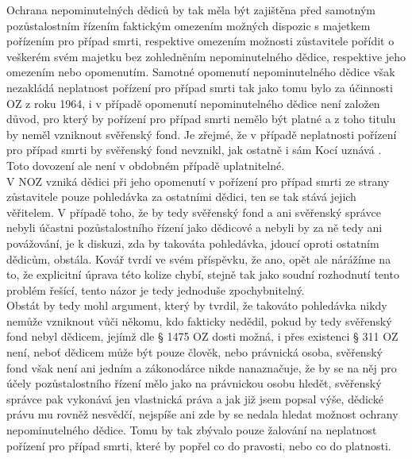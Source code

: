 \documentclass{article}
\begin{document}
 Ochrana nepominutelných dědiců by tak měla být zajištěna před samotným pozůstalostním řízením faktickým omezením možných dispozic s majetkem pořízením pro případ smrti, respektive omezením možnosti zůstavitele pořídit o veškerém svém majetku bez zohledněním nepominutelného dědice, respektive jeho omezením nebo opomenutím. Samotné opomenutí nepominutelného dědice však nezakládá neplatnost pořízení pro případ smrti tak jako tomu bylo za účinnosti OZ z roku 1964, i v případě opomenutí nepominutelného dědice není založen důvod, pro který by pořízení pro případ smrti nemělo být platné a z toho titulu by neměl vzniknout svěřenský fond. Je zřejmé, že v případě neplatnosti pořízení pro případ smrti by svěřenský fond nevznikl, jak ostatně i sám Kocí uznává . Toto dovození ale není v obdobném případě uplatnitelné.\\
 
 V NOZ vzniká dědici při jeho opomenutí v pořízení pro případ smrti ze strany zůstavitele pouze pohledávka za ostatními dědici, ten se tak stává jejich věřitelem. V případě toho, že by tedy svěřenský fond a ani svěřenský správce nebyli účastni pozůstalostního řízení jako dědicové a nebyli by za ně tedy ani povážování, je k diskuzi, zda by takováta pohledávka, jdoucí oproti ostatním dědicům, obstála. Kovář tvrdí ve svém příspěvku, že ano, opět ale nárážíme na to, že explicitní úprava této kolize chybí, stejně tak jako soudní rozhodnutí tento problém řešící, tento názor je tedy jednoduše zpochybnitelný.\\
 
 Obstát by tedy mohl argument, který by tvrdil, že takováto pohledávka nikdy nemůže vzniknout vůči někomu, kdo fakticky nedědil, pokud by tedy svěřenský fond nebyl dědicem, jejímž dle § 1475 OZ dosti možná, i přes existenci § 311 OZ není, neboť dědicem může být pouze člověk, nebo právnická osoba, svěřenský fond však není ani jedním a zákonodárce nikde nanaznačuje, že by se na něj pro účely pozůstalostního řízení mělo jako na právnickou osobu hledět, svěřenský správce pak vykonává jen vlastnická práva a jak již jsem popsal výše, dědické právu mu rovněž nesvědčí, nejspíše ani zde by se nedala hledat možnost ochrany nepominutelného dědice. Tomu by tak zbývalo pouze žalování na neplatnost pořízení pro případ smrti, které by popřel co do pravosti, nebo co do platnosti.\\
  
\end{document}
